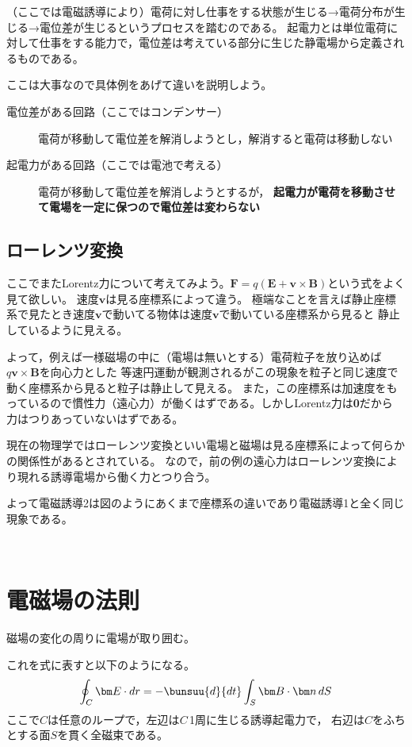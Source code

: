  （ここでは電磁誘導により）電荷に対し仕事をする状態が生じる→電荷分布が生じる→電位差が生じるというプロセスを踏むのである。
 起電力とは単位電荷に対して仕事をする能力で，電位差は考えている部分に生じた静電場から定義されるものである。

 ここは大事なので具体例をあげて違いを説明しよう。

 \begin{description}
  \item[電位差がある回路（ここではコンデンサー）]電荷が移動して電位差を解消しようとし，解消すると電荷は移動しない
  \item[起電力がある回路（ここでは電池で考える）]電荷が移動して電位差を解消しようとするが，%
	     {\bfseries 起電力が電荷を移動させて電場を一定に保つので電位差は変わらない}
 \end{description}

  \subsection{ローレンツ変換}

  ここでまたLorentz力について考えてみよう。$\bm F=q(\bm E+\bm v\times\bm B)$という式をよく見て欲しい。
  速度$\bm v$は見る座標系によって違う。
  極端なことを言えば静止座標系で見たとき速度$\bm v$で動いてる物体は速度$\bm v$で動いている座標系から見ると
  静止しているように見える。

  よって，例えば一様磁場の中に（電場は無いとする）電荷粒子を放り込めば$q\bm v\times\bm B$を向心力とした
  等速円運動が観測されるがこの現象を粒子と同じ速度で動く座標系から見ると粒子は静止して見える。
  また，この座標系は加速度をもっているので慣性力（遠心力）が働くはずである。しかしLorentz力は\textbf 0だから
  力はつりあっていないはずである。

  現在の物理学ではローレンツ変換といい電場と磁場は見る座標系によって何らかの関係性があるとされている。
  なので，前の例の遠心力はローレンツ変換により現れる誘導電場から働く力とつり合う。

  よって電磁誘導\ajMaru 2は図のようにあくまで座標系の違いであり電磁誘導\ajMaru 1と全く同じ現象である。

  ﻿\section{電磁場の法則\protect{}}

  磁場の変化の周りに電場が取り囲む。

  これを式に表すと以下のようになる。
  $$\oint_C\bm E\cdot dr=-\bunsuu{d}{dt}\int_S\bm B\cdot\bm n\,dS$$
  ここで$C$は任意のループで，左辺は$C$\,1周に生じる誘導起電力で，
  右辺は$C$をふちとする面$S$を貫く全磁束である。

